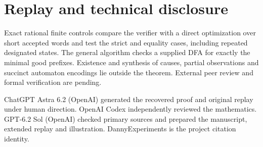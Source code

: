 \documentclass[11pt,a4paper]{amsart}
\begin{document}
\section*{Replay and technical disclosure}
Exact rational finite controls compare the verifier with a direct optimization over short accepted words and test the strict and equality cases, including repeated designated states. The general algorithm checks a supplied DFA for exactly the minimal good prefixes. Existence and synthesis of causes, partial observations and succinct automaton encodings lie outside the theorem. External peer review and formal verification are pending.

ChatGPT Astra 6.2 (OpenAI) generated the recovered proof and original replay under human direction. OpenAI Codex independently reviewed the mathematics. GPT-6.2 Sol (OpenAI) checked primary sources and prepared the manuscript, extended replay and illustration. DannyExperiments is the project citation identity.



\end{document}
